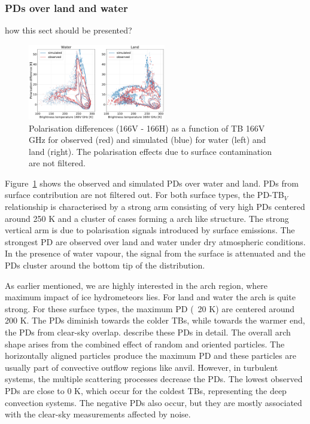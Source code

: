 \documentclass[amt, manuscript]{copernicus}
\newcommand{\todo}[1]{{\color{red} #1}}
\begin{document}
\subsubsection{PDs over land and water}
%
\todo{how this sect should be presented?}
\label{sec:PD}
\begin{figure}[t]
	\includegraphics[width=6cm]{Figures/hist2d_land_water_jan.pdf}
	\caption{Polarisation differences (166V - 166H) as a function of
		TB 166V GHz for observed (red) and simulated (blue) for
		water (left) and land (right). The polarisation effects due to surface contamination are not filtered. }
	\label{fig:PD_water_land}
\end{figure}

Figure~\ref{fig:PD_water_land} shows the observed and simulated PDs over water and land. PDs from surface contribution are not filtered out. For both surface types, the PD-TB$_V$ relationship is characterised by a strong arm consisting of very high PDs centered around 250\,\,K and a cluster of cases forming a arch like structure. The strong vertical arm is due to polarisation signals introduced by surface emissions. The strongest PD are observed over land and water under dry atmospheric conditions. In the presence of water vapour, the signal from the surface is attenuated and the PDs cluster around the bottom tip of the distribution. 

As earlier mentioned, we are highly interested in the arch region, where maximum impact of ice hydrometeors lies. For land and water the arch is quite strong. For these surface types, the maximum PD (~20\,\,K) are centered around 200\,\,K. The PDs diminish towards the colder TBs, while towards the warmer end, the PDs from clear-sky overlap. \citet{gong:micro:17, galligani:param:21} describe these PDs in detail. The overall arch shape arises from the combined effect of random and oriented particles. The horizontally aligned particles produce the maximum PD and these particles are usually part of convective outflow regions like anvil. However, in turbulent systems, the multiple scattering processes decrease the PDs. The lowest observed PDs are close to 0\,\,K, which occur for the coldest TBs, representing the deep convection systems. The negative PDs also occur, but they are mostly associated with the clear-sky measurements affected by noise. 
\end{document}
